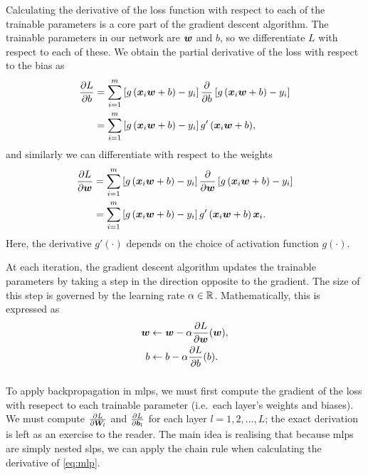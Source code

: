 \documentclass[../report.tex]{subfiles}
\begin{document}
Calculating the derivative of the loss function with respect to each of the trainable parameters is a core part of the gradient descent algorithm.
The trainable parameters in our network are ${\bm{w}}$ and $b$, so we differentiate $L$ with respect to each of these.
We obtain the partial derivative of the loss with respect to the bias as
\begin{align}
    \label{eq:backprop_dL_db}
    \frac{\partial L}{\partial b}
    &= \sum_{i=1}^m{
        \left[g \left({\bm{x}}_i{\bm{w}}+b\right) - y_i \right]
        \frac{\partial}{\partial b} \left[g \left({\bm{x}}_i{\bm{w}}+b\right) - y_i \right]
    } \nonumber \\
    &= \sum_{i=1}^m{
        \left[g \left({\bm{x}}_i{\bm{w}}+b\right) - y_i \right]
        g' \left({\bm{x}}_i{\bm{w}}+b\right)
    },
\end{align}
and similarly we can differentiate with respect to the weights
\begin{align}
    \label{eq:backprop_dL_dw}
    \frac{\partial L}{\partial {\bm{w}}}
    &= \sum_{i=1}^m{
        \left[g \left({\bm{x}}_i{\bm{w}}+b\right) - y_i \right]
        \frac{\partial}{\partial {\bm{w}}} \left[g \left({\bm{x}}_i{\bm{w}}+b\right) - y_i \right]
    } \nonumber \\
    &= \sum_{i=1}^m{
        \left[g \left({\bm{x}}_i{\bm{w}}+b\right) - y_i \right]
        g' \left({\bm{x}}_i{\bm{w}}+b\right)
        {\bm{x}}_i
    }.
\end{align}
Here, the derivative $g'(\cdot)$ depends on the choice of activation function $g(\cdot)$.

At each iteration, the gradient descent algorithm updates the trainable parameters by taking a step in the direction opposite to the gradient.
The size of this step is governed by the learning rate $\alpha \in \mathbb{R}$.
Mathematically, this is expressed as
\begin{align}
    \label{eq:backprop_update_weights}
    {\bm{w}} &\gets {\bm{w}} - \alpha \frac{\partial L}{\partial {\bm{w}}}({\bm{w}}),\\
    \label{eq:backprop_update_bias}
    b &\gets b - \alpha \frac{\partial L}{\partial b}(b).
\end{align}

\subsubsection{}
\label{sec:mlp_training}
To apply backpropagation in \glspl{mlp}, we must first compute the gradient of the loss with resepect to each trainable parameter (i.e.\ each layer's weights and biases).
We must compute $\frac{\partial L}{\partial {\bm{W}}_l}$ and $\frac{\partial L}{\partial {\bm{b}}_l}$ for each layer $l=1,2,\dots,L$; the exact derivation is left as an exercise to the reader.
The main idea is realising that because \glspl{mlp} are simply nested \glspl{slp}, we can apply the chain rule when calculating the derivative of \cref{eq:mlp}.
\end{document}
